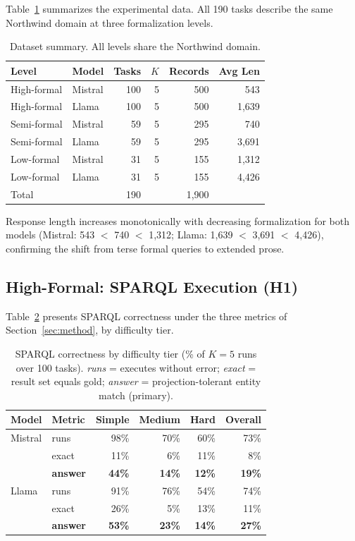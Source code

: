 \documentclass[runningheads]{llncs}
\begin{document}
Table~\ref{tab:dataset} summarizes the experimental data. All 190 tasks describe the same Northwind domain at three formalization levels.

\begin{table}[h]
\centering
\caption{Dataset summary. All levels share the Northwind domain.}
\label{tab:dataset}
\begin{tabular}{llrrrr}
\toprule
Level & Model & Tasks & $K$ & Records & Avg Len \\
\midrule
High-formal & Mistral   & 100 & 5 & 500 & 543 \\
High-formal & Llama     & 100 & 5 & 500 & 1{,}639 \\
Semi-formal & Mistral   &  59 & 5 & 295 & 740 \\
Semi-formal & Llama     &  59 & 5 & 295 & 3{,}691 \\
Low-formal  & Mistral   &  31 & 5 & 155 & 1{,}312 \\
Low-formal  & Llama     &  31 & 5 & 155 & 4{,}426 \\
\midrule
\multicolumn{2}{l}{Total} & 190 & & 1{,}900 & \\
\bottomrule
\end{tabular}
\end{table}

Response length increases monotonically with decreasing formalization for both models (Mistral: 543 $<$ 740 $<$ 1{,}312; Llama: 1{,}639 $<$ 3{,}691 $<$ 4{,}426), confirming the shift from terse formal queries to extended prose.

\subsection{High-Formal: SPARQL Execution (H1)}

Table~\ref{tab:sparql} presents SPARQL correctness under the three metrics of Section~\ref{sec:method}, by difficulty tier.

\begin{table}[h]
\centering
\caption{SPARQL correctness by difficulty tier (\% of $K\!=\!5$ runs over 100 tasks). \emph{runs} = executes without error; \emph{exact} = result set equals gold; \emph{answer} = projection-tolerant entity match (primary).}
\label{tab:sparql}
\setlength{\tabcolsep}{5pt}
\begin{tabular}{llrrrr}
\toprule
Model & Metric & Simple & Medium & Hard & \textbf{Overall} \\
\midrule
Mistral & runs   & 98\% & 70\% & 60\% & 73\% \\
        & exact  & 11\% & 6\%  & 11\% & 8\% \\
        & \textbf{answer} & \textbf{44\%} & \textbf{14\%} & \textbf{12\%} & \textbf{19\%} \\
\addlinespace
Llama   & runs   & 91\% & 76\% & 54\% & 74\% \\
        & exact  & 26\% & 5\%  & 13\% & 11\% \\
        & \textbf{answer} & \textbf{53\%} & \textbf{23\%} & \textbf{14\%} & \textbf{27\%} \\
\bottomrule
\end{tabular}
\end{table}
\end{document}

